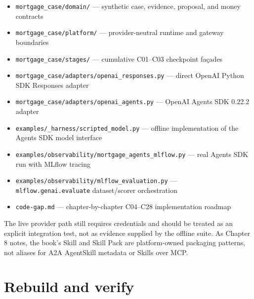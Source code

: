\begin{itemize}

\item \lstinline[style=bookinline]!mortgage_case/domain/! — synthetic case, evidence, proposal, and money contracts

\item \lstinline[style=bookinline]!mortgage_case/platform/! — provider-neutral runtime and gateway boundaries

\item \lstinline[style=bookinline]!mortgage_case/stages/! — cumulative C01–C03 checkpoint façades

\item \lstinline[style=bookinline]!mortgage_case/adapters/openai_responses.py! — direct OpenAI Python SDK Responses adapter

\item \lstinline[style=bookinline]!mortgage_case/adapters/openai_agents.py! — OpenAI Agents SDK 0.22.2 adapter

\item \lstinline[style=bookinline]!examples/_harness/scripted_model.py! — offline implementation of the Agents SDK model interface

\item \lstinline[style=bookinline]!examples/observability/mortgage_agents_mlflow.py! — real Agents SDK run with MLflow tracing

\item \lstinline[style=bookinline]!examples/observability/mlflow_evaluation.py! — \lstinline[style=bookinline]!mlflow.genai.evaluate! dataset/scorer orchestration

\item \lstinline[style=bookinline]!code-gap.md! — chapter-by-chapter C04–C28 implementation roadmap

\end{itemize}

The live provider path still requires credentials and should be treated as an explicit integration test, not as evidence supplied by the offline suite. As Chapter 8 notes, the book's Skill and Skill Pack are platform-owned packaging patterns, not aliases for A2A AgentSkill metadata or Skills over MCP.\par

\section{Rebuild and verify}

